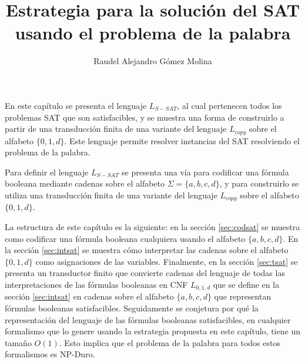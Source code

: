 \documentclass[12pt]{article}
\title{Estrategia para la solución del SAT usando el problema de la palabra}
\author{Raudel Alejandro Gómez Molina}
\begin{document}
\maketitle





En este capítulo se presenta el lenguaje $L_{S-SAT}$, al cual pertenecen todos los problemas SAT que son 
satisfacibles, y se muestra una forma de construirlo a partir de una transducción finita de una variante 
del lenguaje $L_{copy}$ sobre el alfabeto $\{0,1,d\}$. Este lenguaje permite resolver instancias del SAT resolviendo el problema de la palabra.  

Para definir el lenguaje $L_{S-SAT}$ se presenta una vía para codificar una fórmula booleana mediante 
cadenas sobre el alfabeto $\Sigma=\{a, b,c,d\}$, y para construirlo se utiliza una transducción finita 
de una variante del lenguaje $L_{copy}$ sobre el alfabeto $\{0,1,d\}$.

La estructura de este capítulo es la siguiente: en la sección \ref{sec:codsat} se muestra como codificar una 
fórmula booleana cualquiera usando el alfabeto $\{a,b,c,d\}$. En la sección \ref{sec:intsat} se muestra 
cómo interpretar las cadenas sobre el alfabeto $\{0,1,d\}$ como asignaciones de las variables. Finalmente, 
en la sección \ref{sec:tsat} se presenta un transductor finito que convierte cadenas del lenguaje de todas las
interpretaciones de las fórmulas booleanas en CNF
$L_{0,1,d}$ que se define en la sección \ref{sec:intsat} en cadenas sobre el alfabeto $\{a,b,c,d\}$ que 
representan fórmulas booleanas satisfacibles. Seguidamente se conjetura por qué la representación del 
lenguaje de las fórmulas booleanas satisfacibles, en cualquier formalismo que lo genere usando la estrategia 
propuesta en este capítulo, tiene un tamaño $O(1)$. Esto implica que el problema de la palabra para todos estos 
formalismos es NP-Duro.
\end{document}
